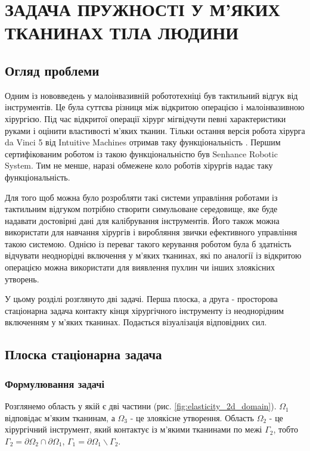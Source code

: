 \chapter{ЗАДАЧА ПРУЖНОСТІ У М'ЯКИХ ТКАНИНАХ ТІЛА ЛЮДИНИ}

\nocite{bahvalov-et-al,benerdge-et-al} 

\section{Огляд проблеми}

Одним із нововведень у малоінвазивній робототехніці був тактильний відгук від інструментів. Це була суттєва різниця між
відкритою операцією і малоінвазивною хірургією. Під час відкритої операції хірург міг відчути певні
характеристики руками і оцінити властивості м'яких тканин. Тільки остання версія робота хірурга da Vinci 5 від
Intuitive Machines отримав таку функціональність \cite{elast-intiitive-machines-force-feedback}. Першим сертифікованим 
роботом із такою функціональністю був Senhance Robotic System. Тим не менше, наразі обмежене коло роботів хірургів надає
таку функціональність.

Для того щоб можна було розробляти такі системи управління роботами із тактильним відгуком потрібно створити симульоване 
середовище, яке буде надавати достовірні дані для калібрування інструментів. Його також можна використати для навчання
хірургів і виробляння звички ефективного управління такою системою. Однією із переваг такого керування роботом була б 
здатність відчувати неоднорідні включення у м'яких тканинах, які по аналогії із відкритою операцією можна використати 
для виявлення пухлин чи інших злоякісних утворень.

У цьому розділі розглянуто дві задачі. Перша плоска, а друга - просторова стаціонарна задача контакту кінця хірургічного 
інструменту із неоднорідним включенням у м'яких тканинах. Подається візуалізація відповідних сил.

\section{Плоска стаціонарна задача}

\subsection{Формулювання задачі}

Розглянемо область у якій є дві частини (рис. \ref{fig:elasticity_2d_domain}). $\Omega_1$ відповідає м'яким тканинам, а
$\Omega_3$ - це злоякісне утворення. Область $\Omega_2$ - це хірургічний інструмент, який контактує із м'якими тканинами
по межі $\Gamma_2$, тобто $\Gamma_2=\partial\Omega_2 \cap \partial\Omega_1$, 
$\Gamma_1 = \partial \Omega_1 \backslash \Gamma_2$.

